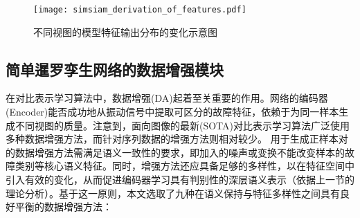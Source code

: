 \documentclass[master]{thesis-uestc}
\begin{document}
\begin{figure}[h]
    \centering
    \texttt{[image: simsiam\_derivation\_of\_features.pdf]}
    \caption{不同视图的模型特征输出分布的变化示意图}
    \label{simsiam_derivation_of_features}
\end{figure}
\FloatBarrier  %
\subsection{简单暹罗孪生网络的数据增强模块}
在对比表示学习算法中，数据增强(DA)起着至关重要的作用。网络的编码器(Encoder)能否成功地从振动信号中提取可区分的故障特征，依赖于为同一样本生成不同视图的质量。注意到，面向图像的最新(SOTA)对比表示学习算法广泛使用多种数据增强方法，而针对序列数据的增强方法则相对较少。
用于生成正样本对的数据增强方法需满足语义一致性的要求，即加入的噪声或变换不能改变样本的故障类别等核心语义特征。同时，增强方法还应具备足够的多样性，以在特征空间中引入有效的变化，从而促进编码器学习具有判别性的深层语义表示（依据上一节的理论分析）。基于这一原则，本文选取了九种在语义保持与特征多样性之间具有良好平衡的数据增强方法：
\end{document}
